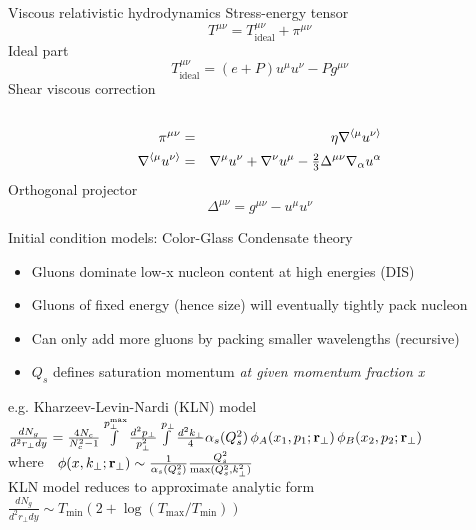 \documentclass[svgnames]{beamer}
\begin{document}
\begin{frame}{Viscous relativistic hydrodynamics}
 Stress-energy tensor 
 \begin{equation*}
  T^{\mu\nu} = T^{\mu\nu}_\text{ideal} + \pi^{\mu\nu}
 \end{equation*}
 Ideal part 
 \begin{equation*}
  T^{\mu\nu}_\text{ideal} = (e+P)u^\mu u^\nu - P g^{\mu\nu}
 \end{equation*}
 Shear viscous correction
 \vspace{-0.1 in}
 \begin{eqnarray*}
  \cr \pi^{\mu\nu} &=& \eta \nabla^{\langle \mu} u^{\nu \rangle} \\
  \nabla^{\langle \mu} u^{\nu \rangle} &=& \nabla^\mu u^\nu + \nabla^\nu u^\mu - \tfrac{2}{3} \Delta^{\mu\nu} \nabla_\alpha u^\alpha
 \end{eqnarray*}
 Orthogonal projector
 \begin{equation}
  \Delta^{\mu\nu} = g^{\mu\nu} - u^\mu u^\nu
 \end{equation}

\end{frame}

\begin{frame}[noframenumbering]{Initial condition models: Color-Glass Condensate theory}
 
\begin{itemize}
 \item Gluons dominate low-x nucleon content at high energies (DIS)
 \item Gluons of fixed energy (hence size) will eventually tightly pack nucleon
 \item Can only add more gluons by packing smaller wavelengths (recursive)
 \item $Q_s$ defines saturation momentum \emph{at given momentum fraction x}
\end{itemize}
\vspace{0.2 in}
e.g. Kharzeev-Levin-Nardi (KLN) model \\
$\frac{dN_g}{d^2r_\perp dy} = \frac{4 N_c}{N_c^2-1} \int\limits^{p_\perp^\text{max}} \frac{d^2p_\perp}{p^2_\perp} \int\limits^{p_\perp} \frac{d^2k_\perp}{4} \alpha_s(Q_s^2) \, \phi_A(x_1,p_1; {\bf r}_\perp) \, \phi_B(x_2,p_2; {\bf r}_\perp)$ \\
\vspace{0.1 in}
where $~~\phi(x,k_\perp; {\bf r}_\perp) \sim \frac{1}{\alpha_s(Q_s^2)} \frac{Q_s^2}{\max(Q_s^2,k^2_\perp)}$\\
\vspace{0.2 in}
KLN model reduces to approximate analytic form \\
\vspace{0.05 in}
$\frac{dN_g}{d^2r_\perp dy} \sim T_\text{min} (2+\log(T_\text{max}/T_\text{min}))$

\end{frame}
\end{document}
